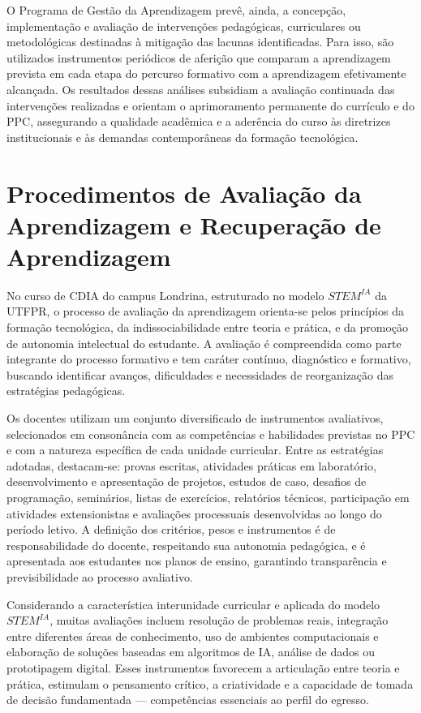 O Programa de Gestão da Aprendizagem prevê, ainda, a concepção, implementação e avaliação de intervenções pedagógicas, curriculares ou metodológicas destinadas à mitigação das lacunas identificadas. Para isso, são utilizados instrumentos periódicos de aferição que comparam a aprendizagem prevista em cada etapa do percurso formativo com a aprendizagem efetivamente alcançada. Os resultados dessas análises subsidiam a avaliação continuada das intervenções realizadas e orientam o aprimoramento permanente do currículo e do PPC, assegurando a qualidade acadêmica e a aderência do curso às diretrizes institucionais e às demandas contemporâneas da formação tecnológica.

\section{Procedimentos de Avaliação da Aprendizagem e Recuperação de Aprendizagem}

No curso de CDIA do campus Londrina, estruturado no modelo $STEM^{IA}$ da UTFPR, o processo de avaliação da aprendizagem orienta-se pelos princípios da formação tecnológica, da indissociabilidade entre teoria e prática, e da promoção de autonomia intelectual do estudante. A avaliação é compreendida como parte integrante do processo formativo e tem caráter contínuo, diagnóstico e formativo, buscando identificar avanços, dificuldades e necessidades de reorganização das estratégias pedagógicas.

Os docentes utilizam um conjunto diversificado de instrumentos avaliativos, selecionados em consonância com as competências e habilidades previstas no PPC e com a natureza específica de cada unidade curricular. Entre as estratégias adotadas, destacam-se: provas escritas, atividades práticas em laboratório, desenvolvimento e apresentação de projetos, estudos de caso, desafios de programação, seminários, listas de exercícios, relatórios técnicos, participação em atividades extensionistas e avaliações processuais desenvolvidas ao longo do período letivo. A definição dos critérios, pesos e instrumentos é de responsabilidade do docente, respeitando sua autonomia pedagógica, e é apresentada aos estudantes nos planos de ensino, garantindo transparência e previsibilidade ao processo avaliativo.

Considerando a característica interunidade curricular e aplicada do modelo $STEM^{IA}$, muitas avaliações incluem resolução de problemas reais, integração entre diferentes áreas de conhecimento, uso de ambientes computacionais e elaboração de soluções baseadas em algoritmos de IA, análise de dados ou prototipagem digital. Esses instrumentos favorecem a articulação entre teoria e prática, estimulam o pensamento crítico, a criatividade e a capacidade de tomada de decisão fundamentada — competências essenciais ao perfil do egresso.

